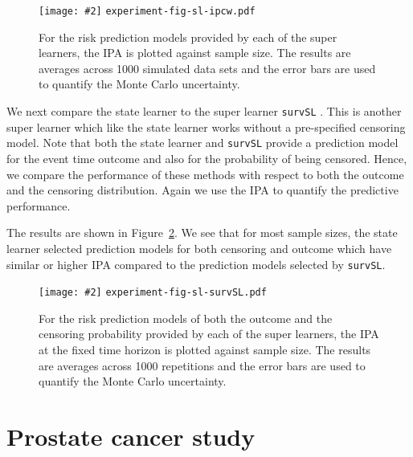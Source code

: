\documentclass{statsoc}
\newcommand{\includeFigCond}[2][]{
  \ifx\nofig\undefined %
    \texttt{[image: \#2]} %
  \else %
    \texttt{#2} %
  \fi %
}
\newcommand{\1}{\mathds{1}}
\begin{document}
\begin{figure}
  \centering %
  \includeFigCond[width=1\linewidth]{experiment-fig-sl-ipcw.pdf}
  \caption[]{For the risk prediction models provided by each of the super
    learners, the IPA is plotted against sample size. The results are averages across 
    1000 simulated data sets and the error bars are used to quantify the Monte Carlo
    uncertainty.
  }
  \label{fig:ipcw-fail}
\end{figure}

We next compare the state learner to the super learner \texttt{survSL}
\citep{westling2021inference}. This is another super learner which
like the state learner works without a pre-specified censoring
model. Note that both the state learner and \texttt{survSL} provide a
prediction model for the event time outcome and also for the
probability of being censored. Hence, we compare the performance of
these methods with respect to both the outcome and the censoring
distribution. Again we use the IPA to quantify the predictive
performance.

The results are shown in Figure~\ref{fig:zelefski}. We see that for
most sample sizes, the state learner selected prediction models for
both censoring and outcome which have similar or higher IPA compared
to the prediction models selected by \texttt{survSL}.
\begin{figure}
  \centering %
  \includeFigCond[width=1\linewidth]{experiment-fig-sl-survSL.pdf}
  \caption[]{For the risk prediction models of both the outcome and the
    censoring probability provided by each of the super learners, the IPA at the fixed time horizon is
    plotted against sample size. The results are averages across 1000 repetitions and
    the error bars are used to quantify the Monte Carlo uncertainty.}
  \label{fig:zelefski}
\end{figure}


\section{Prostate cancer study}
\label{sec:real-data-appl}
\end{document}
